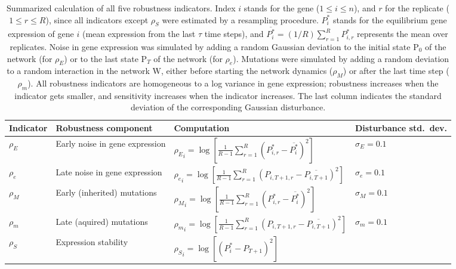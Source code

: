 \documentclass[10pt,a4paper]{article}
\newcommand{\stability}{{\rho_S}}
\newcommand{\earlyenv}{{\rho_E}}
\newcommand{\lateenv}{{\rho_e}}
\newcommand{\earlymut}{{\rho_M}}
\newcommand{\latemut}{{\rho_m}}
\newcommand{\Pp}{\bm{\mathrm P}}
\begin{document}
\begin{table}
\begin{adjustwidth}{-1in}{0in}
\begin{flushright}
\begin{tabular}{lp{3.5cm}ll}
Indicator & Robustness component & Computation & Disturbance std.\ dev. \\ \hline
$\earlyenv$ & \raggedright  Early noise in gene \mbox{expression} & $\earlyenv_i = \log [ \frac{1}{R-1} \sum_{r=1}^R (P_{i,r}^* - \overline{P_{i}^*})^2 ]$ & $\sigma_E=0.1$\\
$\lateenv$  & \raggedright  Late noise in gene \mbox{expression} & $\lateenv_i = \log [ \frac{1}{R-1} \sum_{r=1}^R (P_{i,T+1,r} - \overline{P_{i,T+1}})^2]$ & $\sigma_e=0.1$\\
$\earlymut$ & \raggedright  Early (inherited) \mbox{mutations} & $\earlymut_i = \log[ \frac{1}{R-1} \sum_{r=1}^R (P_{i,r}^* - \overline{P_{i}^*})^2]$ & $\sigma_M = 0.1$\\
$\latemut$ & \raggedright  Late (aquired) \mbox{mutations} & $\latemut_i = \log [ \frac{1}{R-1} \sum_{r=1}^R (P_{i,T+1,r} - \overline{P_{i,T+1}})^2]$ & $\sigma_m = 0.1$ \\
$\stability$ & \raggedright Expression stability & $\stability_i = \log[( P_i^* - P_{T+1})^2]$ & \\
\end{tabular}
\caption{\color{Gray}  \label{tab:indicators} Summarized calculation of all five robustness indicators. Index $i$ stands for the gene ($1 \leq i \leq n$), and $r$ for the replicate ($1 \leq r \leq R$), since all indicators except $\stability$ were estimated by a resampling procedure. $P_i^*$ stands for the equilibrium gene expression of gene $i$ (mean expression from the last $\tau$ time steps), and $\overline{P_{i}^*} = (1/R)\sum_{r=1}^R P_{i,r}^*$ represents the mean over replicates. Noise in gene expression was simulated by adding a random Gaussian deviation to the initial state $\Pp_0$ of the network (for $\earlyenv$) or to the last state $\Pp_T$ of the network (for $\lateenv$). Mutations were simulated by adding a random deviation to a random interaction in the network $\bm{\mathrm W}$, either before starting the network dynamics ($\earlymut$) or after the last time step ($\latemut$). All robustness indicators are homogeneous to a log variance in gene expression; robustness increases when the indicator gets smaller, and sensitivity increases when the indicator increases. The last column indicates the standard deviation of the corresponding Gaussian disturbance. }
\end{flushright}\end{adjustwidth}
\end{table}
\end{document}
